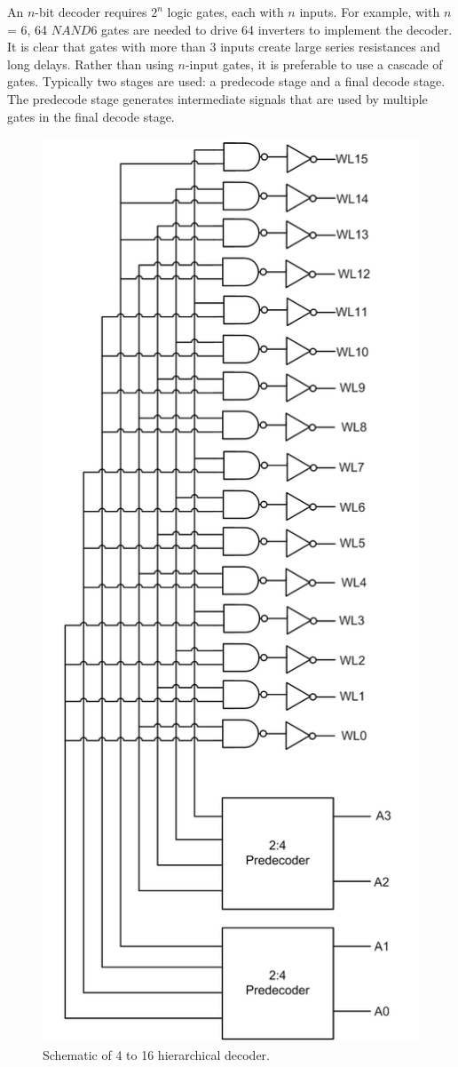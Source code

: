 An $n$-bit decoder requires {$2^n$} logic gates, each with $n$ inputs. For example, with $n$ = 6, 
64 $NAND6$ gates are needed to drive 64 inverters to implement the decoder.
It is clear that gates with more than 3 inputs create large series resistances and long delays. 
Rather than using $n$-input gates, it is preferable to use a cascade of gates. 
Typically two stages are used: a predecode stage and a final decode stage. 
The predecode stage generates intermediate signals that are used 
by multiple gates in the final decode stage.



\begin{figure}[h!]
\centering
\includegraphics[scale=.6]{./figs/4t16decoder.pdf}
\caption{Schematic of 4 to 16 hierarchical decoder.}
\label{fig:4 to 16 decoder}
\end{figure}

